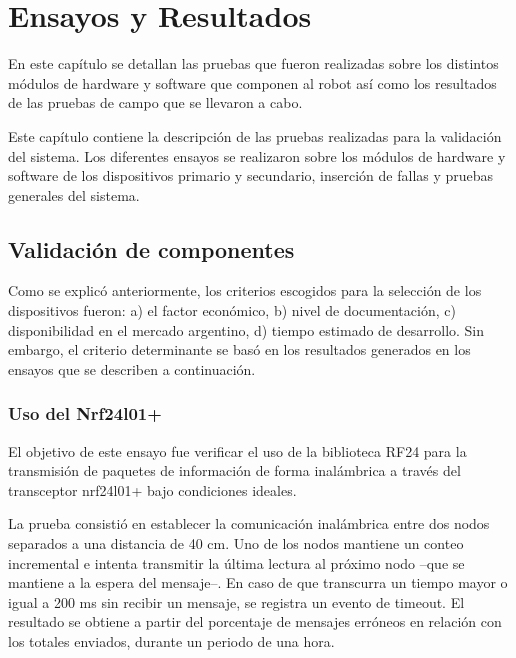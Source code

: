 
\chapter{Ensayos y Resultados} %

\label{Chapter4} %


En este capítulo se detallan las pruebas que fueron realizadas sobre los distintos
módulos de hardware y software que componen al robot así como los resultados
de las pruebas de campo que se llevaron a cabo.

Este capítulo contiene la  descripción de las pruebas realizadas para la validación del sistema. Los diferentes ensayos se realizaron sobre los módulos de hardware y software de los dispositivos primario y secundario, inserción  de fallas y pruebas generales del sistema.

\section{Validación de componentes}
\label{sec:validacion_componentes}

Como se explicó anteriormente, los criterios escogidos para la selección de los dispositivos fueron: a) el factor económico, b) nivel de documentación, c) disponibilidad en el mercado argentino, d) tiempo estimado de desarrollo. Sin embargo, el criterio determinante se basó en los resultados generados en los ensayos que se describen a continuación.

\subsection{Uso del Nrf24l01+}

El objetivo de este ensayo fue verificar el uso de la biblioteca RF24\cite{rf24} para la transmisión de paquetes de información de forma inalámbrica a través del transceptor nrf24l01+ bajo condiciones ideales.

La prueba consistió  en establecer la comunicación inalámbrica entre dos nodos separados a una distancia de 40 cm. Uno de los nodos mantiene un conteo incremental e intenta transmitir la última lectura al próximo nodo --que se mantiene a la espera del mensaje--. En caso de que transcurra un tiempo mayor o igual a 200 ms sin recibir un mensaje, se registra un evento de timeout. El resultado se obtiene a partir del porcentaje de mensajes erróneos en relación con los totales enviados, durante un periodo de una hora.

